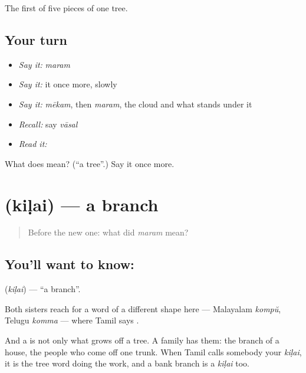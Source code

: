 \begin{grammarlens}[title={What you've built}]
The first of five pieces of one tree.
\end{grammarlens}

\subsection*{Your turn}
\begin{itemize}
\raggedright
  \item \emph{Say it:} \emph{maram}
  \item \emph{Say it:} it once more, slowly
  \item \emph{Say it:} \emph{mēkam}, then \emph{maram}, the cloud and what stands under it
  \item \emph{Recall:} say \emph{vāsal}
  \item \emph{Read it:} \textbf{}
\end{itemize}

\begin{tcolorbox}[breakable,colback=teal!4,colframe=teal!35!black,title={Before you move on}]
What does  mean? (\textquotedblleft{}a tree\textquotedblright{}.) Say it once more.
\end{tcolorbox}
\section[\texorpdfstring{\ta{கிளை} (kiḷai)}{கிளை (kiḷai)}]{ (kiḷai) — a branch}

\label{lesson:TA-C52-branch}



\begin{quote}
Before the new one: what did \emph{maram} mean?
\end{quote}

\subsection*{You'll want to know: }
\textbf{} (\emph{kiḷai}) — \textquotedblleft{}a branch\textquotedblright{}.

Both sisters reach for a word of a different shape here — Malayalam \emph{kompŭ}, Telugu \emph{komma} — where Tamil says .

And a  is not only what grows off a tree. A family has them: the branch of a house, the people who come off one trunk. When Tamil calls somebody your \emph{kiḷai}, it is the tree word doing the work, and a bank branch is a \emph{kiḷai} too.

